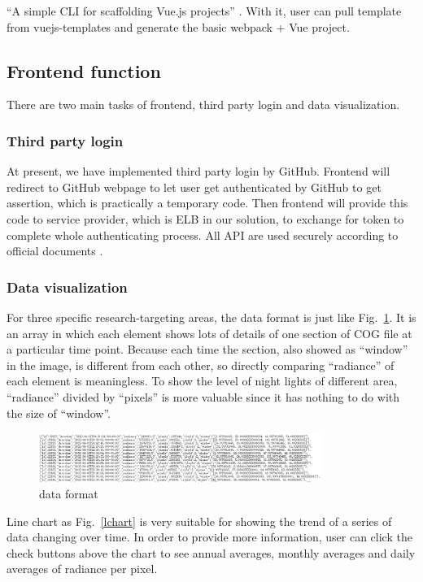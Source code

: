\documentclass[conference]{IEEEtran}
\begin{document}
“A simple CLI for scaffolding Vue.js projects” \cite{Introduc89:online}. With it, user can pull
template from vuejs-templates and generate the basic webpack + Vue project.

\subsection{Frontend function}

There are two main tasks of frontend, third party login and data visualization.

\subsubsection{Third party login}

At present, we have implemented third party login by GitHub. Frontend will redirect to GitHub webpage to let user get authenticated 
by GitHub to get assertion, which is practically a temporary code. Then frontend will provide this code to service provider, which 
is ELB in our solution, to exchange for token to complete whole authenticating process. All API are used securely according to official 
documents \cite{Authoriz26:online}.

\subsubsection{Data visualization}

For three specific research-targeting areas, the data format is just like Fig.~\ref{dffg}. It is an array in which 
each element shows lots of details of one section of COG file at a particular time point. Because each time the section, also showed 
as “window” in the image, is different from each other, so directly comparing “radiance” of each element is meaningless. To show the 
level of night lights of different area, “radiance” divided by “pixels” is more valuable since it has nothing to do with the size of 
“window”.

\begin{figure}[htbp]
    \centerline{\includegraphics[width=260pt]{images/Data_format_frontend_get.png}}
    \caption{data format}
    \label{dffg}
\end{figure}
 
Line chart as Fig.~\ref{lchart} is very suitable for showing the trend of a series of data changing over time. In order to provide more 
information, user can click the check buttons above the chart to see annual averages, monthly averages and daily averages of radiance 
per pixel.  
\end{document}
